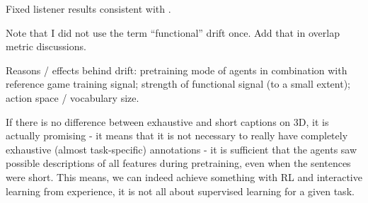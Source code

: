 Fixed listener results consistent with \cite{lazaridou2020multi}.

Note that I did not use the term ``functional'' drift once. Add that in overlap metric discussions.

Reasons / effects behind drift: pretraining mode of agents in combination with reference game training signal; strength of functional signal (to a small extent); action space / vocabulary size. 

If there is no difference between exhaustive and short captions on 3D, it is actually promising - it means that it is not necessary to really have completely exhaustive (almost task-specific) annotations - it is sufficient that the agents saw possible descriptions of all features during pretraining, even when the sentences were short. This means, we can indeed achieve something with RL and interactive learning from experience, it is not all about supervised learning for a given task.